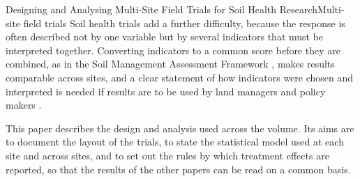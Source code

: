 \documentclass[../main.tex]{subfiles}
\begin{document}
\begin{paper}{Designing and Analysing Multi-Site Field Trials for Soil Health Research}{Multi-site field trials}
Soil health trials add a further difficulty, because the response is often
described not by one variable but by several indicators that must be
interpreted together. Converting indicators to a common score before they are
combined, as in the Soil Management Assessment Framework
\parencite{andrews2004}, makes results comparable across sites, and a clear
statement of how indicators were chosen and interpreted is needed if results
are to be used by land managers and policy makers \parencite{bunemann2018}.

This paper describes the design and analysis used across the volume. Its aims
are to document the layout of the trials, to state the statistical model used
at each site and across sites, and to set out the rules by which treatment
effects are reported, so that the results of the other papers can be read on
a common basis.

\end{paper}
\end{document}
